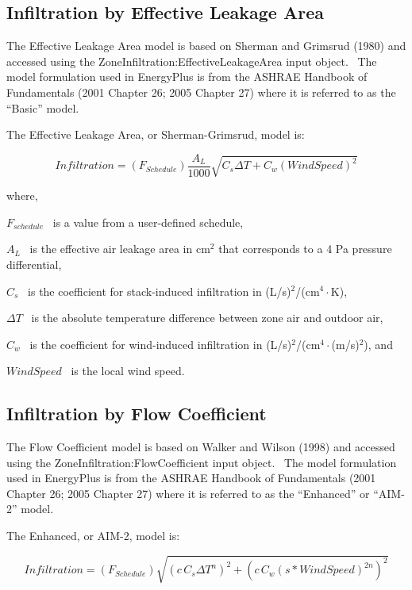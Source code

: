 \subsection{Infiltration by Effective Leakage Area}\label{infiltration-by-effective-leakage-area}

The Effective Leakage Area model is based on Sherman and Grimsrud (1980) and accessed using the ZoneInfiltration:EffectiveLeakageArea input object.~ The model formulation used in EnergyPlus is from the ASHRAE Handbook of Fundamentals (2001 Chapter 26; 2005 Chapter 27) where it is referred to as the ``Basic'' model.

The Effective Leakage Area, or Sherman-Grimsrud, model is:

\begin{equation}
Infiltration = \left( {{F_{Schedule}}} \right)\frac{{{A_L}}}{{1000}}\sqrt {{C_s}\Delta T + {C_w}{{\left( {WindSpeed} \right)}^2}}
\end{equation}

where,

\({F_{schedule}}\) ~is a value from a user-defined schedule,

\({A_L}\) ~is the effective air leakage area in cm\(^{2}\) that corresponds to a 4 Pa pressure differential,

\({C_s}\) ~is the coefficient for stack-induced infiltration in (L/s)\(^{2}\)/(cm\(^{4}\cdot\)K),

\(\Delta T\) ~is the absolute temperature difference between zone air and outdoor air,

\({C_w}\) ~is the coefficient for wind-induced infiltration in (L/s)\(^{2}\)/(cm\(^{4}\cdot\)(m/s)\(^{2}\)), and

\(WindSpeed\) ~is the local wind speed.

\subsection{Infiltration by Flow Coefficient}\label{infiltration-by-flow-coefficient}

The Flow Coefficient model is based on Walker and Wilson (1998) and accessed using the ZoneInfiltration:FlowCoefficient input object.~ The model formulation used in EnergyPlus is from the ASHRAE Handbook of Fundamentals (2001 Chapter 26; 2005 Chapter 27) where it is referred to as the ``Enhanced'' or ``AIM-2'' model.

The Enhanced, or AIM-2, model is:

\begin{equation}
Infiltration = \left( {{F_{Schedule}}} \right)\sqrt {{{\left( {c\,{C_s}\Delta {T^n}} \right)}^2} + {{\left( {c\,{C_w}{{\left( {s * WindSpeed} \right)}^{2n}}} \right)}^2}}
\end{equation}

